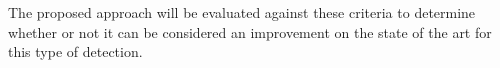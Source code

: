 \documentclass[12pt]{article}
\theoremstyle{remark}
\theoremstyle{definition}
\theoremstyle{definition}
\theoremstyle{definition}
\begin{document}
The proposed approach will be evaluated against these criteria to determine whether or not it can be considered an improvement on the state of the art for this type of detection.

\newpage
\nocite{*} 
{}

% 
% 
\end{document}
